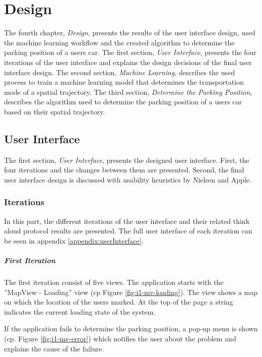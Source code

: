 \chapter{Design}
The fourth chapter, \textit{Design}, presents the results of the user interface design, used the machine learning workflow and the created algorithm to determine the parking position of a users car. The first section, \textit{User Interface}, presents the four iterations of the user interface and explains the design decisions of the final user interface design.  The second section, \textit{Machine Learning}, describes the used process to train a machine learning model that determines the transportation mode of a spatial trajectory. The third section, \textit{Determine the Parking Position}, describes the algorithm used to determine the parking position of a users car based on their spatial trajectory. 



\section{User Interface}
The first section, \textit{User Interface}, presents the designed user interface. First, the four iterations and the changes between them are presented. Second, the final user interface design is discussed with usability heuristics by Nielsen and Apple.

\subsection{Iterations}
In this part, the different iterations of the user interface and their related think aloud protocol results are presented. The full user interface of each iteration can be seen in appendix \ref{appendix:userInterface}.

\paragraph{First Iteration}

The first iteration consist of five views. The application starts with the ''MapView - Loading'' view (cp Figure \ref{fig:i1-mv-loading}). The view shows a map on which the location of the users marked. At the top of the page a string indicates the current loading state of the system.

If the application fails to determine the parking position, a pop-up menu is shown (cp. Figure \ref{fig:i1-mv-error}) which notifies the user about the problem and explains the cause of the failure. 

